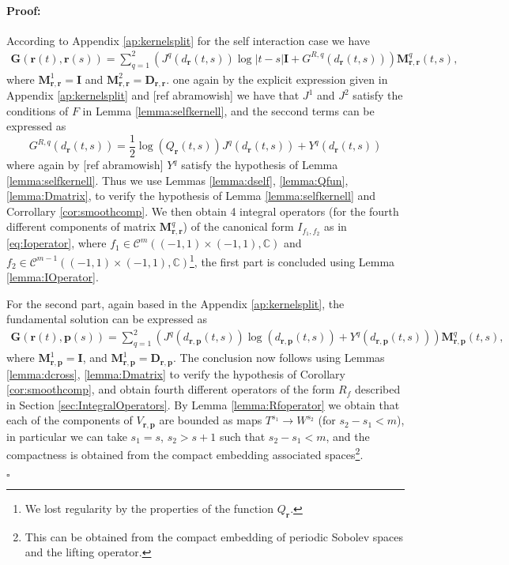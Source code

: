 \documentclass{article}
\newenvironment{proof}{\paragraph{Proof:}}{\hfill$\square$}
\newcommand{\todo}[1]{{\color{red}[#1]}}
\newcommand{\IC}{{\mathbb C}}
\newcommand{\bp}{{\bm p}}
\newcommand{\cmspace}[3]{\mathcal{C}^{#1} \left( #2, #3 \right)}
\newcommand{\br}{\bm{r}}
\newcommand{\iinterv}{(-1,1)\times(-1,1)}
\begin{document}
\begin{proof} 
According to Appendix \ref{ap:kernelsplit} for the self interaction case we have
\begin{align*}
\mathbf{G}(\br(t),\br(s)) = \sum_{q=1}^2
(J^q(d_{\br}(t,s)) \log|t-s| \mathbf{I} + G^{R,q}(d_{\br}(t,s)))\mathbf{M}^q_{\br,\br}(t,s),
\end{align*}
where $\mathbf{M}_{\br,\br}^1 = \mathbf{I}$ and $\mathbf{M}_{\br,\br}^2 = \mathbf{D}_{\br,\br}$. 
one again by the explicit expression given in Appendix  \ref{ap:kernelsplit} and \todo{ref abramowish} we have that $J^1$ and $J^2$ satisfy the conditions of $F$ in Lemma \ref{lemma:selfkernell}, and the seccond terms can be expressed as 
$$G^{R,q}(d_{\br}(t,s)) = \frac{1}{2}\log (Q_{\br}(t,s)) J^q(d_{\br}(t,s))+ Y^q(d_{\br}(t,s))$$
where again by \todo{ref abramowish} $Y^q$ satisfy the hypothesis of Lemma \ref{lemma:selfkernell}. Thus we use Lemmas \ref{lemma:dself}, \ref{lemma:Qfun}, \ref{lemma:Dmatrix}, to verify the hypothesis of Lemma \ref{lemma:selfkernell} and Corrollary \ref{cor:smoothcomp}. We then obtain 4 integral operators (for the fourth different components of matrix $\mathbf{M}^q_{\br,\br}$) of the canonical form $I_{f_1,f_2}$ as in \eqref{eq:Ioperator}, where $f_1 \in \cmspace{m}{\iinterv}{\IC}$ and $f_2 \in \cmspace{m-1}{\iinterv}{\IC}$\footnote{We lost regularity by the properties of the function $Q_{\br}$. }, the first part is concluded using Lemma \ref{lemma:IOperator}. 

For the second part,  again based in the Appendix \ref{ap:kernelsplit}, the fundamental solution can be expressed as
\begin{align*}
\mathbf{G}(\br(t),\bp(s)) = \sum_{q=1}^2
(J^q(d_{\br,\bp}(t,s)) \log(d_{\br,\bp}(t,s)) + Y^q(d_{\br,\bp}(t,s)))\mathbf{M}^q_{\br,\bp}(t,s),
\end{align*}
where $\mathbf{M}^1_{\br,\bp} = \mathbf{I}$, and $\mathbf{M}^1_{\br,\bp} = \mathbf{D}_{\br,\bp}$. The conclusion now follows using Lemmas \ref{lemma:dcross}, \ref{lemma:Dmatrix} to verify the hypothesis of Corollary \ref{cor:smoothcomp}, and obtain fourth different operators of the form $R_f$ described in Section \ref{sec:IntegralOperators}. By  Lemma \ref{lemma:Rfoperator} we obtain that each of the components of $V_{\br,\bp}$ are bounded as maps $T^{s_1} \rightarrow W^{s_2}$ (for $s_2-s_1 < m$), in particular we can take $s_1 = s$, $s_2 > s +1$ such that $s_2-s_1< m$, and the compactness is obtained from the compact embedding associated spaces\footnote{This can be obtained from the compact embedding of periodic Sobolev spaces and the lifting operator.}. 


\end{proof}
\end{document}
